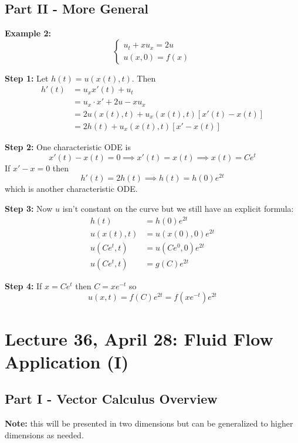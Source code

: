 \documentclass[12pt]{article}
\begin{document}
\subsection*{Part II - More General}
\textbf{Example 2:}
\[\begin{cases}
    u_t + xu_x = 2u\\
    u(x, 0) = f(x)
\end{cases}\]

\textbf{Step 1:} Let $h(t) = u(x(t), t)$. Then
\begin{align*}
    h'(t) &= u_x x'(t) + u_t\\
    &= u_x \cdot x' + 2u - xu_x\\
    &= 2u(x(t), t) + u_x(x(t), t)[x'(t) - x(t)]\\
    &= 2h(t) + u_x(x(t), t)[x'- x(t)]
\end{align*}

\textbf{Step 2:} One characteristic ODE is 
\[x'(t) - x(t) = 0 \implies x'(t) = x(t) \implies x(t) = Ce^t\]
If $x' - x = 0$ then 
\[h'(t) = 2h(t) \implies h(t) = h(0)e^{2t}\]
which is another characteristic ODE. 

\textbf{Step 3:} Now $u$ isn't constant on the curve but we still have an explicit formula:
\begin{align*}
    h(t) &= h(0)e^{2t}\\
    u(x(t), t) &= u(x(0), 0)e^{2t}\\
    u(Ce^t, t) &= u(Ce^0, 0)e^{2t}\\
    u(Ce^t, t) &= g(C)e^{2t}
\end{align*}

\textbf{Step 4:} If $x = Ce^t$ then $C = xe^{-t}$ so 
\[u(x, t) = f(C)e^{2t} = \boxed{f(xe^{-t})e^{2t}}\]

\section*{Lecture 36, April 28: Fluid Flow Application (I)}
\subsection*{Part I - Vector Calculus Overview}
\textbf{Note:} this will be presented in two dimensions but can be generalized to higher dimensions as needed. 
\end{document}
